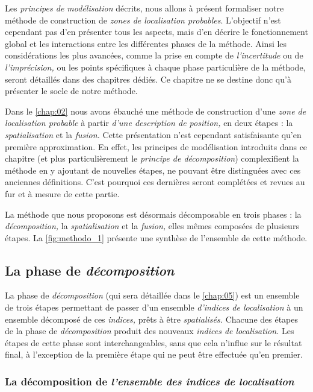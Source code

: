 Les \emph{principes de modélisation} décrits, nous allons à présent
formaliser notre méthode de construction de \emph{zones de
  localisation probables}. L'objectif n'est cependant pas d'en
présenter tous les aspects, mais d'en décrire le fonctionnement global
et les interactions entre les différentes phases de la méthode. Ainsi
les considérations les plus avancées, comme la prise en compte de
\emph{l'incertitude} ou de \emph{l'imprécision,} ou les points
spécifiques à chaque phase particulière de la méthode, seront
détaillés dans des chapitres dédiés. Ce chapitre ne se destine donc
qu'à présenter le socle de notre méthode.

Dans le \autoref{chap:02} nous avons ébauché une méthode de
construction d'une \emph{zone de localisation probable} à partir
\emph{d'une description de position,} en deux étapes : la
\emph{spatialisation} et la \emph{fusion.} Cette présentation n'est
cependant satisfaisante qu'en première approximation. En effet, les
principes de modélisation introduits dans ce chapitre (et plus
particulièrement le \emph{principe de décomposition}) complexifient la
méthode en y ajoutant de nouvelles étapes, ne pouvant être distinguées
avec ces anciennes définitions. C'est pourquoi ces dernières seront
complétées et revues au fur et à mesure de cette partie.

La méthode que nous proposons est désormais décomposable en trois
phases : la \emph{décomposition,} la \emph{spatialisation} et la
\emph{fusion,} elles mêmes composées de plusieurs étapes. La
\autoref{fig:methodo_1} présente une synthèse de l'ensemble de cette
méthode.

\subsection{La phase de \emph{décomposition}}

La phase de \emph{décomposition} (qui sera détaillée dans le
\autoref{chap:05}) est un ensemble de trois étapes permettant de
passer d'un ensemble \emph{d'indices de localisation} à un ensemble
décomposé de ces \emph{indices,} prêts à être \emph{spatialisés.}
Chacune des étapes de la phase de \emph{décomposition} produit des
nouveaux \emph{indices de localisation.} Les étapes de cette phase
sont interchangeables, sans que cela n'influe sur le résultat final, à
l'exception de la première étape qui ne peut être effectuée qu'en
premier.

\subsubsection{La décomposition de \emph{l'ensemble des indices de
    localisation}}

